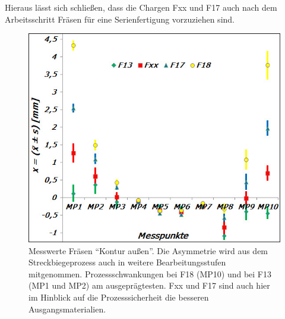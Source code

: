 \documentclass[12pt,a4paper,parskip,twoside,BCOR5mm,headsepline]{scrartcl}
\begin{document}
Hieraus lässt sich schließen, dass die Chargen Fxx und F17 auch nach dem Arbeitsschritt Fräsen für eine Serienfertigung vorzuziehen sind. 
\begin{figure}[hbtp]
\centering
\includegraphics[width=.8\textwidth]{fraesneumess}
\caption{Messwerte Fräsen  "`Kontur außen"'. Die Asymmetrie wird  aus dem Streckbiegeprozess auch in weitere Bearbeitungsstufen mitgenommen. Prozessschwankungen bei F18 (MP10) und bei F13 (MP1 und MP2) am ausgeprägtesten. Fxx und F17 sind auch hier im Hinblick auf die Prozesssicherheit die besseren Ausgangsmaterialien.}
\label{fig:fraesneumess}
\end{figure}



\newpage
\end{document}
